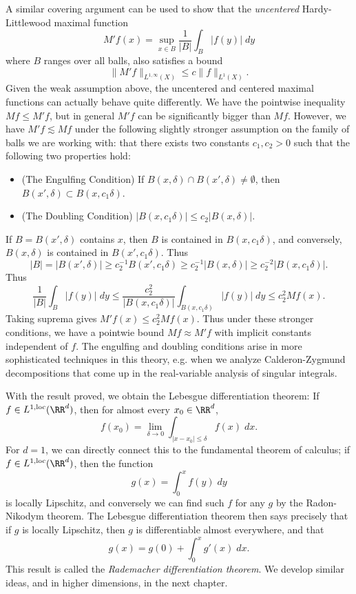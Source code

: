 \begin{remark}
    A similar covering argument can be used to show that the \emph{uncentered} Hardy-Littlewood maximal function
    \[ M'f(x) = \sup_{x \in B} \frac{1}{|B|} \int_B |f(y)|\; dy \]
    where $B$ ranges over all balls, also satisfies a bound
    \[ \| M' f \|_{L^{1,\infty}(X)} \leq c \| f \|_{L^1(X)}. \]
    Given the weak assumption above, the uncentered and centered maximal functions can actually behave quite differently. We have the pointwise inequality $Mf \leq M'f$, but in general $M'f$ can be significantly bigger than $Mf$. However, we have $M'f \lesssim Mf$ under the following slightly stronger assumption on the family of balls we are working with: that there exists two constants $c_1,c_2 > 0$ such that the following two properties hold:
    \begin{itemize}
        \item (The Engulfing Condition) If $B(x,\delta) \cap B(x',\delta) \neq \emptyset$, then $B(x',\delta) \subset B(x,c_1 \delta)$.
        \item (The Doubling Condition) $|B(x,c_1 \delta)| \leq c_2 |B(x,\delta)|$.
    \end{itemize}
    If $B = B(x',\delta)$ contains $x$, then $B$ is contained in $B(x,c_1 \delta)$, and conversely, $B(x,\delta)$ is contained in $B(x',c_1 \delta)$. Thus
    \[ |B| = |B(x',\delta)| \geq c_2^{-1} B(x', c_1 \delta) \geq c_2^{-1} |B(x,\delta)| \geq c_2^{-2} |B(x,c_1 \delta)|. \]
    Thus
    \[ \frac{1}{|B|} \int_B |f(y)|\; dy \leq \frac{c_2^2}{|B(x,c_1 \delta)|} \int_{B(x,c_1 \delta)} |f(y)|\; dy \leq c_2^2 Mf(x). \]
    Taking suprema gives $M'f(x) \leq c_2^2 Mf(x)$. Thus under these stronger conditions, we have a pointwie bound $Mf \approx M'f$ with implicit constants independent of $f$. The engulfing and doubling conditions arise in more sophisticated techniques in this theory, e.g. when we analyze Calderon-Zygmund decompositions that come up in the real-variable analysis of singular integrals.
\end{remark}

With the result proved, we obtain the Lebesgue differentiation theorem: If $f \in L^{1,\text{loc}}(\RR^d)$, then for almost every $x_0 \in \RR^d$,
%
\[ f(x_0) = \lim_{\delta \to 0} \int_{|x - x_0| \leq \delta} f(x)\; dx. \]
%
For $d = 1$, we can directly connect this to the fundamental theorem of calculus; if $f \in L^{1,\text{loc}}(\RR^d)$, then the function
%
\[ g(x) = \int_0^x f(y)\; dy \]
%
is locally Lipschitz, and conversely we can find such $f$ for any $g$ by the Radon-Nikodym theorem. The Lebesgue differentiation theorem then says precisely that if $g$ is locally Lipschitz, then $g$ is differentiable almost everywhere, and that
%
\[ g(x) = g(0) + \int_0^x g'(x)\; dx. \]
%
This result is called the \emph{Rademacher differentiation theorem}. We develop similar ideas, and in higher dimensions, in the next chapter.

